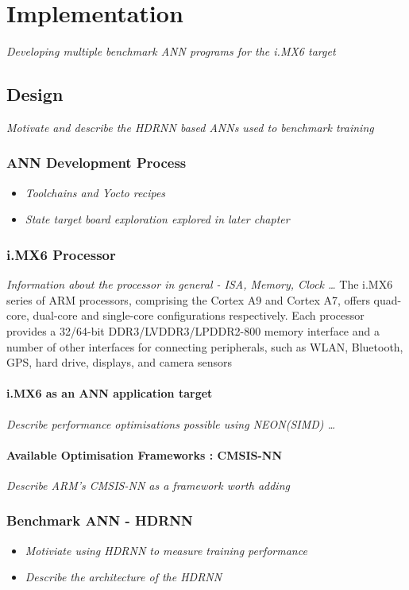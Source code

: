 \part{Implementation}

\textit{Developing multiple benchmark ANN programs for the i.MX6 target}

\chapter{Design}
\textit{Motivate and describe the HDRNN based ANNs used to benchmark training}

\section[Artificial Neural Network Development Process]{ANN Development Process}
\begin{itemize}
	\item \textit{Toolchains and Yocto recipes}
	\item \textit{State target board exploration explored in later chapter}
\end{itemize}

\section[iMX6 Processor]{i.MX6 Processor}
\textit{Information about the processor in general - ISA, Memory, Clock \dots}
The i.MX6 series of ARM processors, comprising the Cortex A9 and Cortex A7, offers quad-core, dual-core and single-core configurations respectively. Each processor provides a 32/64-bit DDR3/LVDDR3/LPDDR2-800 memory interface and a number of other interfaces for connecting peripherals, such as WLAN, Bluetooth, GPS, hard drive, displays, and camera sensors


\subsection[ANN Acceleration]{i.MX6 as an ANN application target}
\textit{Describe performance optimisations possible using NEON(SIMD) \dots}

\subsection[CMSIS-NN]{Available Optimisation Frameworks : CMSIS-NN}
\textit{Describe ARM's CMSIS-NN as a framework worth adding}

\section[Handwritten Digit Recognition (HDR)]{Benchmark ANN - HDRNN}
\begin{itemize}
	\item \textit{Motiviate using HDRNN to measure training performance}
	\item \textit{Describe the architecture of the HDRNN}
\end{itemize}

